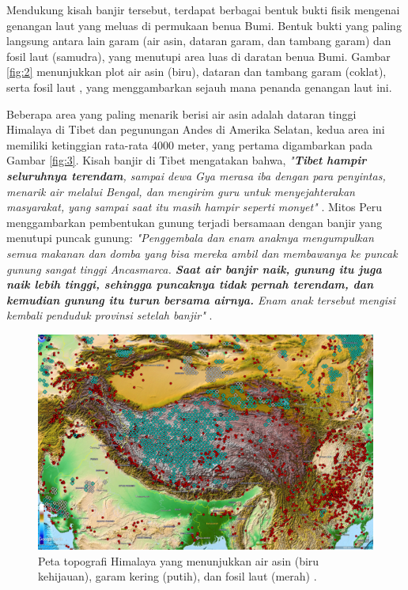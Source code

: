 \documentclass[10pt,twocolumn,letterpaper]{article}
\begin{document}
Mendukung kisah banjir tersebut, terdapat berbagai bentuk bukti fisik mengenai genangan laut yang meluas di permukaan benua Bumi. Bentuk bukti yang paling langsung antara lain garam (air asin, dataran garam, dan tambang garam) dan fosil laut (samudra), yang menutupi area luas di daratan benua Bumi. Gambar \ref{fig:2} menunjukkan plot air asin (biru), dataran dan tambang garam (coklat), serta fosil laut \cite{15,16,86,87}, yang menggambarkan sejauh mana penanda genangan laut ini.

Beberapa area yang paling menarik berisi air asin adalah dataran tinggi Himalaya di Tibet dan pegunungan Andes di Amerika Selatan, kedua area ini memiliki ketinggian rata-rata 4000 meter, yang pertama digambarkan pada Gambar \ref{fig:3}. Kisah banjir di Tibet mengatakan bahwa, \textit{"\textbf{Tibet hampir seluruhnya terendam}, sampai dewa Gya merasa iba dengan para penyintas, menarik air melalui Bengal, dan mengirim guru untuk menyejahterakan masyarakat, yang sampai saat itu masih hampir seperti monyet"} \cite{3}. Mitos Peru menggambarkan pembentukan gunung terjadi bersamaan dengan banjir yang menutupi puncak gunung: \textit{"Penggembala dan enam anaknya mengumpulkan semua makanan dan domba yang bisa mereka ambil dan membawanya ke puncak gunung sangat tinggi Ancasmarca. \textbf{Saat air banjir naik, gunung itu juga naik lebih tinggi, sehingga puncaknya tidak pernah terendam, dan kemudian gunung itu turun bersama airnya.} Enam anak tersebut mengisi kembali penduduk provinsi setelah banjir"} \cite{3}.

\begin{figure}[t]
\begin{center}
   \includegraphics[width=1\linewidth]{tibet.jpg}
\end{center}
   \caption{Peta topografi Himalaya yang menunjukkan air asin (biru kehijauan), garam kering (putih), dan fosil laut (merah) \cite{15,16,86,87}.}
\label{fig:3}
\label{fig:onecol}
\end{figure}
\end{document}
